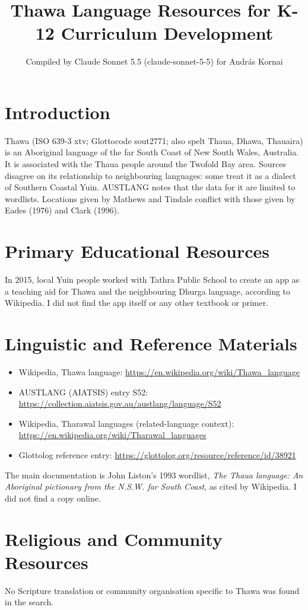 \documentclass[12pt]{article}
\title{Thawa Language Resources for K-12 Curriculum Development}
\author{Compiled by Claude Sonnet 5.5 (claude-sonnet-5-5) for Andr\'as Kornai}
\date{}
\begin{document}
\maketitle

\section{Introduction}
Thawa (ISO 639-3 xtv; Glottocode sout2771; also spelt Thaua, Dhawa, Thauaira) is an Aboriginal language of the far South Coast of New South Wales, Australia. It is associated with the Thaua people around the Twofold Bay area. Sources disagree on its relationship to neighbouring languages: some treat it as a dialect of Southern Coastal Yuin. AUSTLANG notes that the data for it are limited to wordlists. Locations given by Mathews and Tindale conflict with those given by Eades (1976) and Clark (1996).

\section{Primary Educational Resources}
In 2015, local Yuin people worked with Tathra Public School to create an app as a teaching aid for Thawa and the neighbouring Dhurga language, according to Wikipedia. I did not find the app itself or any other textbook or primer.

\section{Linguistic and Reference Materials}
\begin{itemize}
\item Wikipedia, Thawa language: \url{https://en.wikipedia.org/wiki/Thawa_language}
\item AUSTLANG (AIATSIS) entry S52: \url{https://collection.aiatsis.gov.au/austlang/language/S52}
\item Wikipedia, Tharawal languages (related-language context): \url{https://en.wikipedia.org/wiki/Tharawal_languages}
\item Glottolog reference entry: \url{https://glottolog.org/resource/reference/id/38921}
\end{itemize}
The main documentation is John Liston's 1993 wordlist, \emph{The Thaua language: An Aboriginal pictionary from the N.S.W. far South Coast}, as cited by Wikipedia. I did not find a copy online.

\section{Religious and Community Resources}
No Scripture translation or community organisation specific to Thawa was found in the search.
\end{document}
